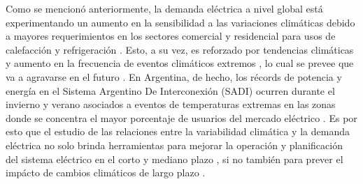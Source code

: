 \documentclass[11pt,a4paper]{article}
\begin{document}
Como se mencionó anteriormente, la demanda eléctrica a nivel global está experimentando un aumento en la sensibilidad a las variaciones climáticas debido a mayores requerimientos en los sectores comercial y residencial para usos de calefacción y refrigeración \cite{detemperatura, cassarino2018impact}. Esto, a su vez, es reforzado por tendencias climáticas y aumento en la frecuencia de eventos climáticos extremos \cite{apadula2012relationships,ke2016quantifying,anel2017impact}, lo cual se prevee que va a agravarse en el futuro \cite{eskeland2010electricity, mideksa2010impact}. En Argentina, de hecho, los récords de potencia y energía en el Sistema Argentino De Interconexión (SADI) ocurren durante el invierno y verano asociados a eventos de temperaturas extremas en las zonas donde se concentra el mayor porcentaje de usuarios del mercado eléctrico \cite{cammesa-web}. Es por esto que el estudio de las relaciones entre la variabilidad climática y la demanda eléctrica no solo brinda herramientas para mejorar la operación y planificación del sistema eléctrico en el corto y mediano plazo \cite{detemperatura, macmackin2019modeling}, si no también para prever el impácto de cambios climáticos de largo plazo \cite{bessec2008non, eskeland2010electricity}.
\end{document}
